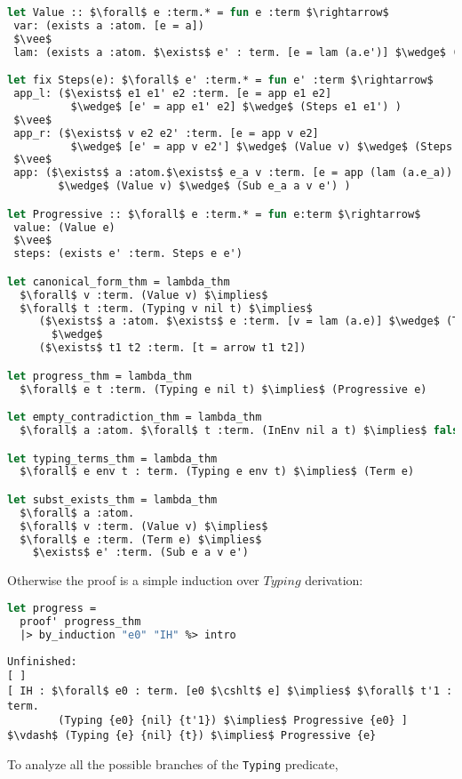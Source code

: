 \documentclass[english, mgr]{iithesis}
\renewcommand{\tt}[1]{\texttt{\small{#1}}}
\begin{document}
\begin{lstlisting}[mathescape,language=OCaml]
let Value :: $\forall$ e :term.* = fun e :term $\rightarrow$
 var: (exists a :atom. [e = a])
 $\vee$
 lam: (exists a :atom. $\exists$ e' : term. [e = lam (a.e')] $\wedge$ (Term e'))

let fix Steps(e): $\forall$ e' :term.* = fun e' :term $\rightarrow$
 app_l: ($\exists$ e1 e1' e2 :term. [e = app e1 e2]
          $\wedge$ [e' = app e1' e2] $\wedge$ (Steps e1 e1') )
 $\vee$
 app_r: ($\exists$ v e2 e2' :term. [e = app v e2]
          $\wedge$ [e' = app v e2'] $\wedge$ (Value v) $\wedge$ (Steps e2 e2') )
 $\vee$
 app: ($\exists$ a :atom.$\exists$ e_a v :term. [e = app (lam (a.e_a)) v]
        $\wedge$ (Value v) $\wedge$ (Sub e_a a v e') )

let Progressive :: $\forall$ e :term.* = fun e:term $\rightarrow$
 value: (Value e)
 $\vee$
 steps: (exists e' :term. Steps e e')

let canonical_form_thm = lambda_thm
  $\forall$ v :term. (Value v) $\implies$
  $\forall$ t :term. (Typing v nil t) $\implies$
     ($\exists$ a :atom. $\exists$ e :term. [v = lam (a.e)] $\wedge$ (Term e))
       $\wedge$
     ($\exists$ t1 t2 :term. [t = arrow t1 t2])

let progress_thm = lambda_thm
  $\forall$ e t :term. (Typing e nil t) $\implies$ (Progressive e)

let empty_contradiction_thm = lambda_thm
  $\forall$ a :atom. $\forall$ t :term. (InEnv nil a t) $\implies$ false

let typing_terms_thm = lambda_thm
  $\forall$ e env t : term. (Typing e env t) $\implies$ (Term e)

let subst_exists_thm = lambda_thm
  $\forall$ a :atom.
  $\forall$ v :term. (Value v) $\implies$
  $\forall$ e :term. (Term e) $\implies$
    $\exists$ e' :term. (Sub e a v e')
\end{lstlisting}
Otherwise the proof is a simple induction over $Typing$ derivation:
\begin{lstlisting}[language=OCaml]
let progress =
  proof' progress_thm
  |> by_induction "e0" "IH" %> intro
\end{lstlisting}
\begin{lstlisting}[mathescape]
Unfinished:
[ ]
[ IH : $\forall$ e0 : term. [e0 $\cshlt$ e] $\implies$ $\forall$ t'1 : term.
        (Typing {e0} {nil} {t'1}) $\implies$ Progressive {e0} ]
$\vdash$ (Typing {e} {nil} {t}) $\implies$ Progressive {e}
\end{lstlisting}
To analyze all the possible branches of the \tt{Typing} predicate,
\end{document}
